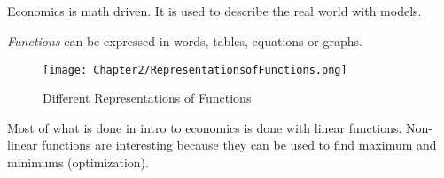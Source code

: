 \newpage
\subsection{}

Economics is math driven.
It is used to describe the real world with models.

\begin{definition}
    \emph{Functions} can be expressed in words, tables, equations or graphs.
\end{definition}
\begin{figure}[h!]
    \centering
    \texttt{[image: Chapter2/RepresentationsofFunctions.png]}
    \caption{Different Representations of Functions}
\end{figure}
Most of what is done in intro to economics is done with linear functions.
Non-linear functions are interesting because they can be used to find maximum and minimums (optimization).